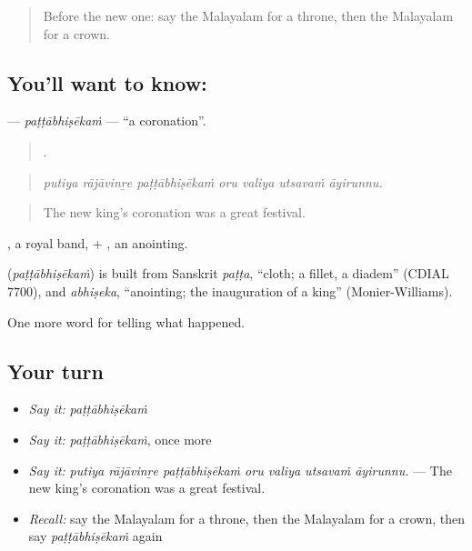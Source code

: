 \label{lesson:ML-C398-pattabhisekam}



\begin{quote}
Before the new one: say the Malayalam for a throne, then the Malayalam for a crown.
\end{quote}

\subsection*{You'll want to know: }
\textbf{} — \emph{paṭṭābhiṣēkaṁ} — \textquotedblleft{}a coronation\textquotedblright{}.

\begin{quote}
      .
\end{quote}

\begin{quote}
\emph{putiya rājāvinṟe paṭṭābhiṣēkaṁ oru valiya utsavaṁ āyirunnu.}
\end{quote}

\begin{quote}
The new king's coronation was a great festival.
\end{quote}

, a royal band, + , an anointing.

\begin{cousinweb}
\textbf{} (\emph{paṭṭābhiṣēkaṁ}) is built from Sanskrit \emph{paṭṭa}, \textquotedblleft{}cloth; a fillet, a diadem\textquotedblright{} (CDIAL 7700), and \emph{abhiṣeka}, \textquotedblleft{}anointing; the inauguration of a king\textquotedblright{} (Monier-Williams).
\end{cousinweb}

\begin{grammarlens}[title={What you've built}]
One more word for telling what happened.
\end{grammarlens}

\subsection*{Your turn}
\begin{itemize}
\raggedright
  \item \emph{Say it:} \emph{paṭṭābhiṣēkaṁ}
  \item \emph{Say it:} \emph{paṭṭābhiṣēkaṁ}, once more
  \item \emph{Say it:} \emph{putiya rājāvinṟe paṭṭābhiṣēkaṁ oru valiya utsavaṁ āyirunnu.} — The new king's coronation was a great festival.
  \item \emph{Recall:} say the Malayalam for a throne, then the Malayalam for a crown, then say \emph{paṭṭābhiṣēkaṁ} again
\end{itemize}

